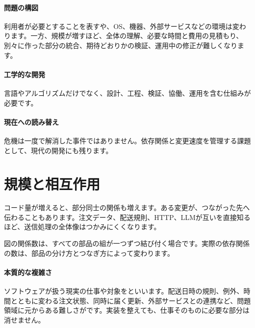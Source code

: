 \paragraph{問題の構図}
        利用者が必要とすることを表すや、OS、機器、外部サービスなどの環境は変わります。一方、規模が増すほど、全体の理解、必要な時間と費用の見積もり、別々に作った部分の統合、期待どおりかの検証、運用中の修正が難しくなります。

\par
\endgroup
\medskip
\begingroup
\paragraph{工学的な開発}
        言語やアルゴリズムだけでなく、設計、工程、検証、協働、運用を含む仕組みが必要です。

\paragraph{現在への読み替え}
        危機は一度で解消した事件ではありません。依存関係と変更速度を管理する課題として、現代の開発にも残ります。

\par
\endgroup
\par
\endgroup


\section{規模と相互作用}
\label{sec:04-software-engineering-02}

コード量が増えると、部分同士の関係も増えます。ある変更が、つながった先へ伝わることもあります。注文データ、配送規則、HTTP、LLMが互いを直接知るほど、送信処理の全体像はつかみにくくなります。

\begingroup
\begingroup
      \centering
\par
\endgroup
図の関係数は、すべての部品の組が一つずつ結び付く場合です。実際の依存関係の数は、部品の分け方とつなぎ方によって変わります。
\medskip
\begingroup
\paragraph{本質的な複雑さ}
        ソフトウェアが扱う現実の仕事や対象をといいます。配送日時の規則、例外、時間とともに変わる注文状態、同時に届く更新、外部サービスとの連携など、問題領域に元からある難しさがです。実装を整えても、仕事そのものに必要な部分は消せません。

